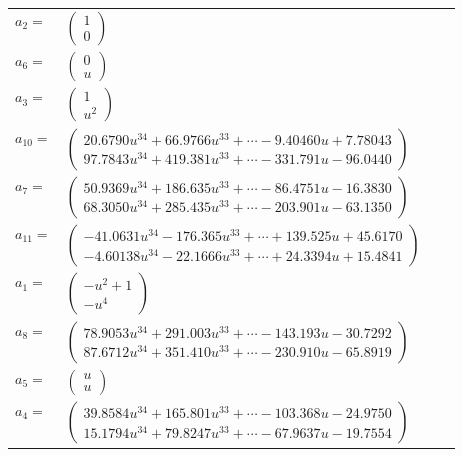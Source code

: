 \documentclass[1p]{elsarticle_modified}
\theoremstyle{definition}
\begin{document}
\begin{tabular}{m{7pt} m{180pt} m{7pt} m{180pt} }
\flushright $a_{2}=$&$\begin{pmatrix}1\\0\end{pmatrix}$ \\
\flushright $a_{6}=$&$\begin{pmatrix}0\\u\end{pmatrix}$ \\
\flushright $a_{3}=$&$\begin{pmatrix}1\\u^2\end{pmatrix}$ \\
\flushright $a_{10}=$&$\begin{pmatrix}20.6790 u^{34}+66.9766 u^{33}+\cdots-9.40460 u+7.78043\\97.7843 u^{34}+419.381 u^{33}+\cdots-331.791 u-96.0440\end{pmatrix}$ \\
\flushright $a_{7}=$&$\begin{pmatrix}50.9369 u^{34}+186.635 u^{33}+\cdots-86.4751 u-16.3830\\68.3050 u^{34}+285.435 u^{33}+\cdots-203.901 u-63.1350\end{pmatrix}$ \\
\flushright $a_{11}=$&$\begin{pmatrix}-41.0631 u^{34}-176.365 u^{33}+\cdots+139.525 u+45.6170\\-4.60138 u^{34}-22.1666 u^{33}+\cdots+24.3394 u+15.4841\end{pmatrix}$ \\
\flushright $a_{1}=$&$\begin{pmatrix}- u^2+1\\- u^4\end{pmatrix}$ \\
\flushright $a_{8}=$&$\begin{pmatrix}78.9053 u^{34}+291.003 u^{33}+\cdots-143.193 u-30.7292\\87.6712 u^{34}+351.410 u^{33}+\cdots-230.910 u-65.8919\end{pmatrix}$ \\
\flushright $a_{5}=$&$\begin{pmatrix}u\\u\end{pmatrix}$ \\
\flushright $a_{4}=$&$\begin{pmatrix}39.8584 u^{34}+165.801 u^{33}+\cdots-103.368 u-24.9750\\15.1794 u^{34}+79.8247 u^{33}+\cdots-67.9637 u-19.7554\end{pmatrix}$ \\

\end{tabular}
\end{document}
